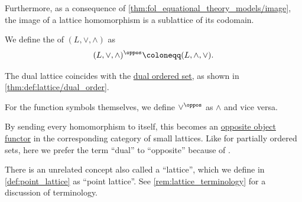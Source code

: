 \begin{definition}
\begin{thmenum}
    Furthermore, as a consequence of \cref{thm:fol_equational_theory_models/image}, the image of a lattice homomorphism is a sublattice of its codomain.

    \mimprovised We define the  of \( (L, \vee, \wedge) \) as
    \begin{equation*}
      (L, \vee, \wedge)^\oppos \coloneqq (L, \wedge, \vee).
    \end{equation*}

    The dual lattice coincides with the \hyperref[def:partially_ordered_set/opposite]{dual ordered set}, as shown in \cref{thm:def:lattice/dual_order}.

    For the function symbols themselves, we define \( {\vee}^\oppos \) as \( {\wedge} \) and vice versa.

    By sending every homomorphism to itself, this becomes an \hyperref[con:opposite_object]{opposite object functor} in the corresponding category of small lattices. Like for partially ordered sets, here we prefer the term \enquote{dual} to \enquote{opposite} because of .
  \end{thmenum}
\end{definition}
\begin{comments}
  \item There is an unrelated concept also called a \enquote{lattice}, which we define in \cref{def:point_lattice} as \enquote{point lattice}. See \cref{rem:lattice_terminology} for a discussion of terminology.
\end{comments}

